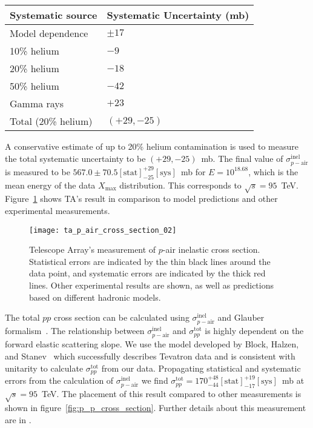 \documentclass[12pt]{article}
\newcommand{\xm}{$X_{\mathrm{max}}$}
\newcommand{\spptotal}{$\sigma_{pp}^{\mathrm{tot}}$}
\newcommand{\spairinel}{$\sigma_{p-\mathrm{air}}^{\mathrm{inel}}$}
\begin{document}
\medskip
\begin{center}
      \begin{tabular}{l l}
        Systematic source     & Systematic Uncertainty (mb) \\
          \hline
          Model dependence      &$\pm 17$ \\
          10\% helium           &$-9$ \\
          20\% helium           &$-18$ \\
          50\% helium           &$-42$ \\
          Gamma rays            &$+23$ \\
          \hline\hline
          Total (20\% helium)   &$(+29, -25)$
       \end{tabular}
\end{center}
\medskip

A conservative estimate of up to 20\% helium contamination is used to
measure the total systematic uncertainty to be $(+29, -25)$~mb. The
final value of \spairinel{} is measured to be $567.0 \pm
70.5[\mathrm{stat}]^{+29}_{-25}[\mathrm{sys}]$~mb for $E =
10^{18.68}$, which is the mean energy of the data \xm{}
distribution. This corresponds to $\sqrt{s} =
95$~TeV. Figure~\ref{fig:p_air_cross_section} shows TA's result in
comparison to model predictions and other experimental measurements.

\begin{figure}
  \centering
  \texttt{[image: ta\_p\_air\_cross\_section\_02]}
  \caption{Telescope Array's measurement of $p$-air inelastic cross
    section. Statistical errors are indicated by the thin black lines
    around the data point, and systematic errors are indicated by the
    thick red lines. Other experimental results are shown, as well as
    predictions based on different hadronic models.}
  \label{fig:p_air_cross_section}
\end{figure}


The total $pp$ cross section can be calculated using \spairinel{} and
Glauber formalism~\cite{Glauber:1970jm}. The relationship between
\spairinel{} and \spptotal{} is highly dependent on the forward
elastic scattering slope. We use the model developed by Block, Halzen,
and Stanev~\cite{Block:2011nr} which successfully describes Tevatron
data and is consistent with unitarity to calculate \spptotal{} from
our data. Propagating statistical and systematic errors from the
calculation of \spairinel{} we find $\sigma_{pp}^{\mathrm{tot}} =
170^{+48}_{-44}[\mathrm{stat}]^{+19}_{-17}[\mathrm{sys}]$~mb at
$\sqrt{s} = 95$~TeV. The placement of this result compared to other
measurements is shown in figure~\ref{fig:p_p_cross_section}. Further
details about this measurement are in \cite{Abbasi:2015fdr}.
\end{document}
